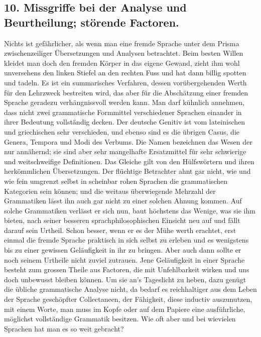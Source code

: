 \subsection*{10. Missgriffe bei der Analyse und Beurtheilung; störende Factoren.}\label{IV.IV.10}

Nichts ist gefährlicher, als wenn man eine fremde Sprache unter dem Prisma zwischenzeiliger Übersetzungen und Analysen betrachtet. Beim besten Willen kleidet man doch den fremden Körper in das eigene Gewand, zieht ihm wohl unversehens den linken Stiefel an den rechten Fuss und hat dann billig spotten und tadeln. Es ist ein summarisches Verfahren, dessen vorübergehenden Werth für den Lehrzweck  bestreiten wird, das aber für die Abschätzung einer fremden Sprache geradezu verhängnissvoll werden kann. Man darf kühnlich annehmen, dass nicht zwei grammatische Formmittel verschiedener Sprachen einander in \label{fp.386} ihrer Bedeutung vollständig decken. Der deutsche Genitiv ist vom lateinischen und griechischen sehr verschieden, und ebenso sind es die übrigen Casus, die Genera, Tempora und Modi des Verbums. Die Namen bezeichnen das Wesen der  nur annähernd; sie sind  aber sehr mangelhafte Ersatzmittel für sehr schwierige und weitschweifige Definitionen. Das Gleiche gilt von den Hülfswörtern und ihren herkömmlichen Übersetzungen. Der flüchtige Betrachter ahnt gar nicht, wie  und wie fein umgrenzt selbst in scheinbar rohen Sprachen die grammatischen Kategorien sein können; und die weitaus überwiegende Mehrzahl der Grammatiken lässt ihn auch gar nicht zu einer solchen Ahnung kommen. Auf solche Grammatiken verlässt er sich nun, baut höchstens das Wenige, was sie ihm bieten, nach seiner besseren sprachphilosophischen Einsicht neu auf und fällt darauf sein Urtheil. Schon besser, wenn er es der Mühe werth erachtet, erst einmal die fremde Sprache praktisch in sich selbst zu erleben und es wenigstens bis zu einer gewissen Geläufigkeit in ihr zu bringen. Aber auch dann sollte er noch seinem Urtheile nicht zuviel zutrauen. Jene Geläufigkeit in einer Sprache besteht zum grossen Theile aus Factoren, die mit Unfehlbarkeit wirken und uns doch unbewusst bleiben können. Um sie an’s \label{sp.406} Tageslicht zu heben, dazu genügt die übliche grammatische Analyse nicht, da bedarf es reichhaltiger aus dem Leben der Sprache geschöpfter Collectaneen, der Fähigkeit, diese inductiv auszunutzen, mit einem Worte, man muss im Kopfe oder auf dem Papiere eine ausführliche, möglichst vollständige Grammatik besitzen. Wie oft aber und bei wievielen Sprachen hat man es so weit gebracht?

